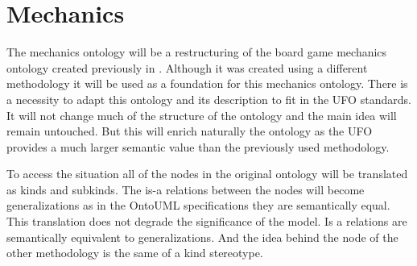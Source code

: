 \section{Mechanics}
The mechanics ontology will be a restructuring of the board game mechanics ontology created previously in \cite{kritz_buildingOntology}. Although it was created using a different methodology it will be used as a foundation for this mechanics ontology. There is a necessity to adapt this ontology and its description to fit in the UFO standards. It will not change much of the structure of the ontology and the main idea will remain untouched. But this will enrich naturally the ontology as the UFO provides a much larger semantic value than the previously used methodology.

To access the situation all of the nodes in the original ontology will be translated as kinds and subkinds. The is-a relations between the nodes will become generalizations as in the OntoUML specifications they are semantically equal. This translation does not degrade the significance of the model. Is a relations are semantically equivalent to generalizations. And the idea behind the node of the other methodology is the same of a kind stereotype.